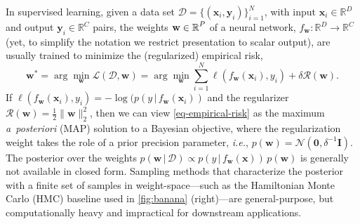 \documentclass{article}
\makeatletter
\newcommand{\ie}{\textit{i.e.\@}\xspace}
\newcommand{\dataset}{\ensuremath{\mathcal{D}}}
\newcommand{\inputDomain}{\ensuremath{\mathbb{R}^{D}}}
\newcommand{\outputDomain}{\ensuremath{\mathbb{R}^{C}}}
\newcommand{\weights}{\ensuremath{\mathbf{w}}}
\newcommand{\mbf}[1]{\mathbf{#1}}
\renewcommand{\mid}{\,|\,}
\newcommand{\MI}{\mbf{I}}
\newcommand{\vzeros}{\mbf{0}}
\newcommand{\vx}{\mbf{x}}
\newcommand{\vy}{\mbf{y}}
\newcommand{\vw}{\mbf{w}}
\newcommand{\Norm}{\mathcal{N}}
\makeatother
\begin{document}
%
In supervised learning, given a data set $\dataset = \{(\vx_{i} , \vy_{i})\}_{i=1}^{N}$, with input $\vx_i \in \inputDomain$ and output $\vy_i \in \outputDomain$ pairs, the weights $\weights \in \R^{P}$ of a neural network, $f_\mathbf{w}: \inputDomain \to \outputDomain$ (yet, to simplify the notation we restrict presentation to scalar output), are usually trained to minimize the (regularized) empirical risk,
%
\begin{equation} \label{eq-empirical-risk}
  \weights^{*} = 
  \arg \min_{\weights} \mathcal{L}(\dataset,\weights) =
  \arg \min_{\weights} \textstyle\sum_{i=1}^{N} \ell(f_\weights(\mathbf{x}_{i}), y_i) + \delta \mathcal{R}(\weights).
\end{equation}
%
If $\ell(f_\weights(\vx_{i}), y_i) = -\log(p(y \mid f_\weights(\vx_{i}))$ and the regularizer $\mathcal{R}(\weights) = \frac{1}{2}\|\weights\|^{2}_2$, then we can view \cref{eq-empirical-risk} as the maximum {\it a~posteriori} (MAP) solution to a Bayesian objective, where the regularization weight takes the role of a prior precision parameter, \ie, $p(\vw) = \Norm(\vzeros, \delta^{-1} \MI)$.
The posterior over the weights ${p(\vw \mid \dataset) \propto p(y \mid f_{\weights}(\vx)) \, p(\weights)}$ is generally not available in closed form. Sampling methods that characterize the posterior with a finite set of samples in weight-space---such as the Hamiltonian Monte Carlo (HMC) baseline used in \cref{fig:banana} (right)---are general-purpose, but computationally heavy and impractical for downstream applications.
\end{document}
